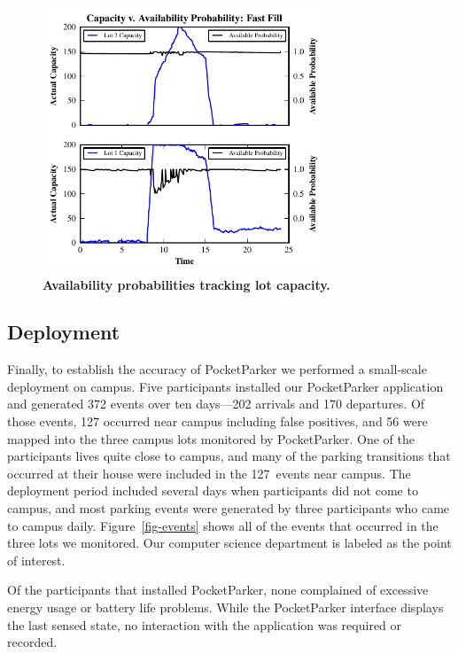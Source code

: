 \begin{figure}
\centering
\includegraphics[width=3.325in]{./simulator/figures/tracking_fastfill.pdf}

\caption{\textbf{Availability probabilities tracking lot capacity.} }

\label{fig-trackingexample}
\end{figure}


\subsection{Deployment}

Finally, to establish the accuracy of PocketParker we performed a small-scale
deployment on campus. Five participants installed our PocketParker
application and generated 372 events over ten days---202 arrivals and 170
departures. Of those events, 127 occurred near campus including false
positives, and 56 were mapped into the three campus lots monitored by
PocketParker. One of the participants lives quite close to campus, and many
of the parking transitions that occurred at their house were included in the
127~events near campus. The deployment period included several days when
participants did not come to campus, and most parking events were generated
by three participants who came to campus daily. Figure~\ref{fig-events} shows
all of the events that occurred in the three lots we monitored. Our computer
science department is labeled as the point of interest.

Of the participants that installed PocketParker, none complained of excessive
energy usage or battery life problems. While the PocketParker interface
displays the last sensed state, no interaction with the application was
required or recorded.


